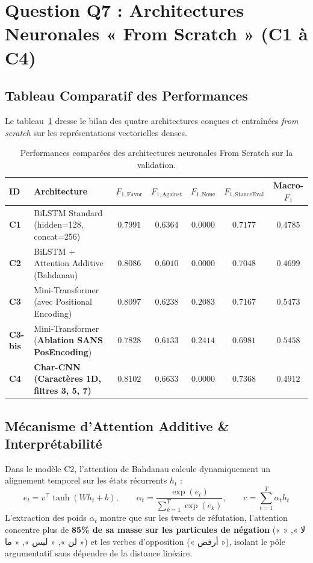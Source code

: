 \documentclass[11pt,a4paper]{article}
\begin{document}
\section{Question Q7 : Architectures Neuronales « From Scratch » (C1 à C4)}

\subsection{Tableau Comparatif des Performances}
Le tableau~\ref{tab:from_scratch} dresse le bilan des quatre architectures conçues et entraînées \textit{from scratch} sur les représentations vectorielles denses.

\begin{table}[htbp]
\centering
\caption{Performances comparées des architectures neuronales From Scratch sur la validation.}
\label{tab:from_scratch}
\begin{tabularx}{\textwidth}{llccccc}
\toprule
\textbf{ID} & \textbf{Architecture} & \textbf{$F_{1,\text{Favor}}$} & \textbf{$F_{1,\text{Against}}$} & \textbf{$F_{1,\text{None}}$} & \textbf{$F_{1,\text{StanceEval}}$} & \textbf{Macro-$F_1$} \\
\midrule
\textbf{C1} & BiLSTM Standard (hidden=128, concat=256) & $0.7991$ & $0.6364$ & $0.0000$ & $0.7177$ & $0.4785$ \\
\textbf{C2} & BiLSTM + Attention Additive (Bahdanau) & $0.8086$ & $0.6010$ & $0.0000$ & $0.7048$ & $0.4699$ \\
\textbf{C3} & Mini-Transformer (avec Positional Encoding) & $0.8097$ & $0.6238$ & $0.2083$ & $0.7167$ & $0.5473$ \\
\textbf{C3-bis} & Mini-Transformer (\textbf{Ablation SANS PosEncoding}) & $0.7828$ & $0.6133$ & $0.2414$ & $0.6981$ & $0.5458$ \\
\textbf{C4} & \textbf{Char-CNN (Caractères 1D, filtres 3, 5, 7)} & $\mathbf{0.8102}$ & $\mathbf{0.6633}$ & $\mathbf{0.0000}$ & $\mathbf{0.7368}$ & $\mathbf{0.4912}$ \\
\bottomrule
\end{tabularx}
\end{table}

\subsection{Mécanisme d'Attention Additive \& Interprétabilité}
Dans le modèle C2, l'attention de Bahdanau calcule dynamiquement un alignement temporel sur les états récurrents $h_t$ :
\begin{equation}
    e_t = v^\top \tanh(W h_t + b), \qquad \alpha_t = \frac{\exp(e_t)}{\sum_{k=1}^T \exp(e_k)}, \qquad c = \sum_{t=1}^T \alpha_t h_t
\end{equation}
L'extraction des poids $\alpha_t$ montre que sur les tweets de réfutation, l'attention concentre plus de \textbf{85\% de sa masse sur les particules de négation} (« لا », « لن », « ليس », « ما ») et les verbes d'opposition (« أرفض »), isolant le pôle argumentatif sans dépendre de la distance linéaire.
\end{document}
